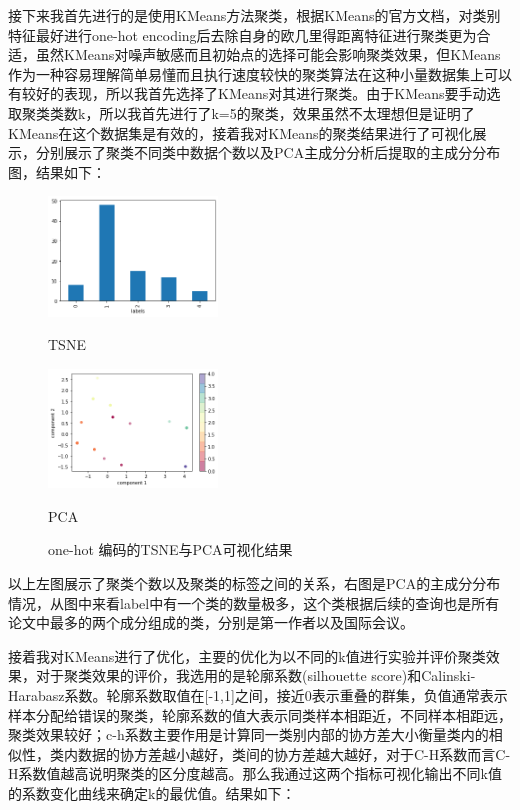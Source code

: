 接下来我首先进行的是使用KMeans方法聚类，根据KMeans的官方文档，对类别特征最好进行one-hot encoding后去除自身的欧几里得距离特征进行聚类更为合适，虽然KMeans对噪声敏感而且初始点的选择可能会影响聚类效果，但KMeans作为一种容易理解简单易懂而且执行速度较快的聚类算法在这种小量数据集上可以有较好的表现，所以我首先选择了KMeans对其进行聚类。由于KMeans要手动选取聚类类数k，所以我首先进行了k=5的聚类，效果虽然不太理想但是证明了KMeans在这个数据集是有效的，接着我对KMeans的聚类结果进行了可视化展示，分别展示了聚类不同类中数据个数以及PCA主成分分析后提取的主成分分布图，结果如下：
\begin{figure}[htb]
    \vspace{13pt} %
    \centering
    \includegraphics[width=0.4\textwidth]{images/Kmeans-5-label-distribution-label-encoding.png}
    \caption{TSNE}
    \hspace{0.5in}
    \includegraphics[width=0.4\textwidth]{images/Kmeans-5-PCA-label-encoding.png}
    \caption{PCA}
    \caption{one-hot 编码的TSNE与PCA可视化结果}\label{} %
  \end{figure}


以上左图展示了聚类个数以及聚类的标签之间的关系，右图是PCA的主成分分布情况，从图中来看label中有一个类的数量极多，这个类根据后续的查询也是所有论文中最多的两个成分组成的类，分别是第一作者以及国际会议。

接着我对KMeans进行了优化，主要的优化为以不同的k值进行实验并评价聚类效果，对于聚类效果的评价，我选用的是轮廓系数(silhouette score)和Calinski-Harabasz系数。轮廓系数取值在[-1,1]之间，接近0表示重叠的群集，负值通常表示样本分配给错误的聚类，轮廓系数的值大表示同类样本相距近，不同样本相距远，聚类效果较好；c-h系数主要作用是计算同一类别内部的协方差大小衡量类内的相似性，类内数据的协方差越小越好，类间的协方差越大越好，对于C-H系数而言C-H系数值越高说明聚类的区分度越高。那么我通过这两个指标可视化输出不同k值的系数变化曲线来确定k的最优值。结果如下：



